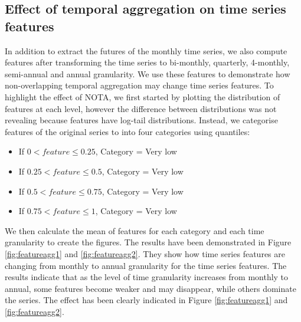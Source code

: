 \documentclass[preprint, 3p,
authoryear]{elsarticle} %
\providecommand{\tightlist}{%
  \setlength{\itemsep}{0pt}\setlength{\parskip}{0pt}}
\begin{document}
\hypertarget{taeffect}{%
\subsection{Effect of temporal aggregation on time series
features}\label{taeffect}}

In addition to extract the futures of the monthly time series, we also
compute features after transforming the time series to bi-monthly,
quarterly, 4-monthly, semi-annual and annual granularity. We use these
features to demonstrate how non-overlapping temporal aggregation may
change time series features. To highlight the effect of NOTA, we first
started by plotting the distribution of features at each level, however
the difference between distributions was not revealing because features
have log-tail distributions. Instead, we categorise features of the
original series to into four categories using quantiles:

\begin{itemize}
\tightlist
\item
  If \(0 < feature \leqslant 0.25\), Category = Very low
\item
  If \(0.25 < feature \leqslant 0.5\), Category = Very low
\item
  If \(0.5 < feature \leqslant 0.75\), Category = Very low
\item
  If \(0.75 < feature \leqslant 1\), Category = Very low
\end{itemize}

We then calculate the mean of features for each category and each time
granularity to create the figures. The results have been demonstrated in
Figure \ref{fig:featureagg1} and \ref{fig:featureagg2}. They show how
time series features are changing from monthly to annual granularity for
the time series features. The results indicate that as the level of time
granularity increases from monthly to annual, some features become
weaker and may disappear, while others dominate the series. The effect
has been clearly indicated in Figure \ref{fig:featureagg1} and
\ref{fig:featureagg2}.
\end{document}
